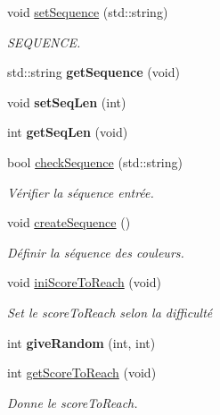 \begin{DoxyCompactItemize}
void \hyperlink{class_mod_simon_a3b031c28072d6564e238daacc254c522}{set\+Sequence} (std\+::string)
\begin{DoxyCompactList}\small\item\em S\+E\+Q\+U\+E\+N\+CE. \end{DoxyCompactList}\item 
\mbox{\label{class_mod_simon_af4468b44e2f45d96ac297b3badf1721a}} 
std\+::string {\bfseries get\+Sequence} (void)
\item 
\mbox{\label{class_mod_simon_a822c4354ab7deb2acb4159b5f0ad9e3e}} 
void {\bfseries set\+Seq\+Len} (int)
\item 
\mbox{\label{class_mod_simon_a7a4e1652d1f2f3f994a91411381dd78a}} 
int {\bfseries get\+Seq\+Len} (void)
\item 
\mbox{\label{class_mod_simon_aa55ab18b884c06ae652dba62326059bc}} 
bool \hyperlink{class_mod_simon_aa55ab18b884c06ae652dba62326059bc}{check\+Sequence} (std\+::string)
\begin{DoxyCompactList}\small\item\em Vérifier la séquence entrée. \end{DoxyCompactList}\item 
\mbox{\label{class_mod_simon_a1c2ab181d2f03d62f44fd837645a8a07}} 
void \hyperlink{class_mod_simon_a1c2ab181d2f03d62f44fd837645a8a07}{create\+Sequence} ()
\begin{DoxyCompactList}\small\item\em Définir la séquence des couleurs. \end{DoxyCompactList}\item 
void \hyperlink{class_mod_simon_a01de269fc7beadbe1199c233ba24ada4}{ini\+Score\+To\+Reach} (void)
\begin{DoxyCompactList}\small\item\em Set le score\+To\+Reach selon la difficulté \end{DoxyCompactList}\item 
\mbox{\label{class_mod_simon_afc89d421c3275fb5e0403c7ee40b0c9a}} 
int {\bfseries give\+Random} (int, int)
\item 
\mbox{\label{class_mod_simon_ae98908b71e867da9afd281564fc118c5}} 
int \hyperlink{class_mod_simon_ae98908b71e867da9afd281564fc118c5}{get\+Score\+To\+Reach} (void)
\begin{DoxyCompactList}\small\item\em Donne le score\+To\+Reach. \end{DoxyCompactList}\end{DoxyCompactItemize}


